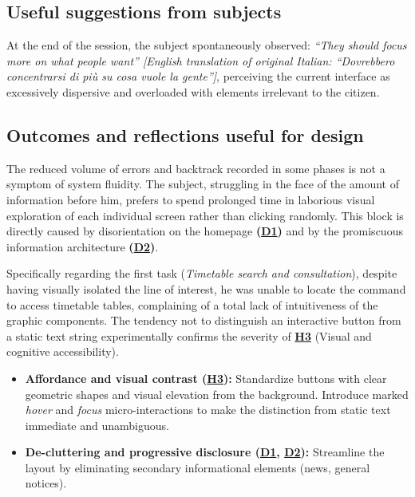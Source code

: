 ﻿\documentclass[11pt,a4paper]{article}
\begin{document}
\subsection*{Useful suggestions from subjects}
\begin{tcolorbox}[base]
At the end of the session, the subject spontaneously observed: \textit{``They should focus more on what people want'' [English translation of original Italian: ``Dovrebbero concentrarsi di pi\`u su cosa vuole la gente'']}, perceiving the current interface as excessively dispersive and overloaded with elements irrelevant to the citizen.
\end{tcolorbox}

\subsection*{Outcomes and reflections useful for design}
\begin{tcolorbox}[base]
The reduced volume of errors and backtrack recorded in some phases is not a symptom of system fluidity. The subject, struggling in the face of the amount of information before him, prefers to spend prolonged time in laborious visual exploration of each individual screen rather than clicking randomly. This block is directly caused by disorientation on the homepage \textbf{(\hyperref[iss:D1]{D1})} and by the promiscuous information architecture \textbf{(\hyperref[iss:D2]{D2})}.

Specifically regarding the first task (\textit{Timetable search and consultation}), despite having visually isolated the line of interest, he was unable to locate the command to access timetable tables, complaining of a total lack of intuitiveness of the graphic components.
The tendency not to distinguish an interactive button from a static text string experimentally confirms the severity of \textbf{\hyperref[iss:H3]{H3}} (Visual and cognitive accessibility).

\begin{itemize}[leftmargin=*]
    \item \textbf{Affordance and visual contrast (\hyperref[iss:H3]{H3}):} Standardize buttons with clear geometric shapes and visual elevation from the background. Introduce marked \textit{hover} and \textit{focus} micro-interactions to make the distinction from static text immediate and unambiguous.
    \item \textbf{De-cluttering and progressive disclosure (\hyperref[iss:D1]{D1}, \hyperref[iss:D2]{D2}):} Streamline the layout by eliminating secondary informational elements (news, general notices).
\end{itemize}
\end{tcolorbox}
\end{document}
